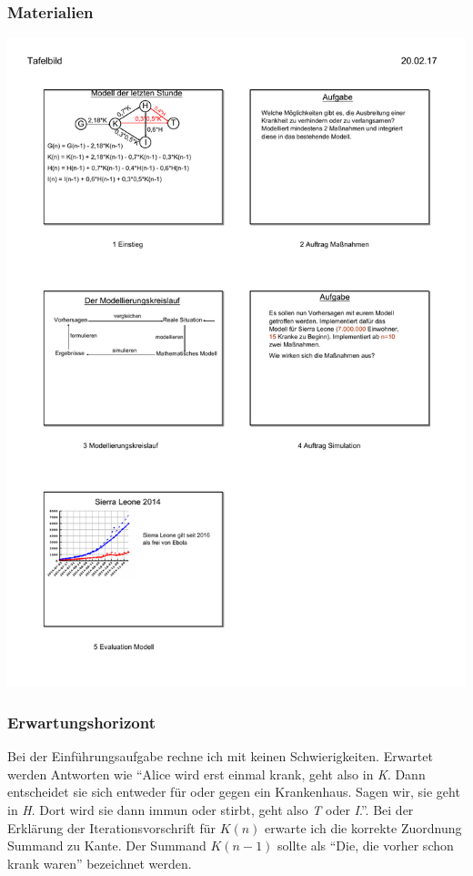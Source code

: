 \subsubsection{Materialien}
\includegraphics[width=\textwidth]{projekt/Tafelbild_3_c}
\subsubsection{Erwartungshorizont}
Bei der Einführungsaufgabe rechne ich mit keinen Schwierigkeiten. Erwartet werden Antworten wie ``Alice wird erst einmal krank, geht also in \emph{K}. Dann entscheidet sie sich entweder für oder gegen ein Krankenhaus. Sagen wir, sie geht in \emph{H}. Dort wird sie dann immun oder stirbt, geht also \emph{T} oder \emph{I}.''. Bei der Erklärung der Iterationsvorschrift für $K(n)$ erwarte ich die korrekte Zuordnung Summand zu Kante. Der Summand $K(n-1)$ sollte als ``Die, die vorher schon krank waren'' bezeichnet werden.

